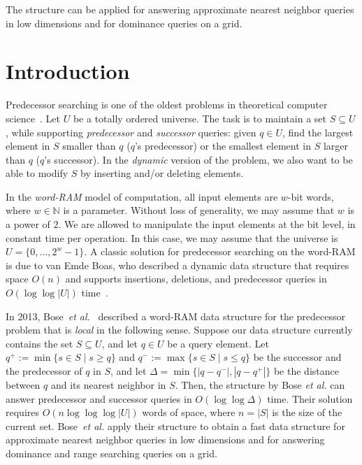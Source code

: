 \documentclass[a4paper,11pt]{article}
\newcommand{\N}{\mathbb{N}}
\newcommand{\etal}{\emph{et al.}\xspace}
\newcommand{\?}{\mskip1.5mu}
\begin{document}
The structure can be applied for answering approximate nearest
neighbor queries in low dimensions and for dominance queries on
a grid.

\section{Introduction}

Predecessor searching is one of the oldest problems in 
theoretical computer science~\cite{CormenLeRiSt09,Knuth98}.
Let $U$ be a totally ordered universe. The task
is to maintain a set $S \subseteq U$,
while supporting
\emph{predecessor} and \emph{successor} queries: 
given $q \in U$, find the largest element in $S$ 
smaller than $q$ ($q$'s predecessor) or the 
smallest element in $S$ larger than $q$
($q$'s successor). In the \emph{dynamic}
version of the problem, we also want to 
be able to modify $S$ by inserting and/or 
deleting elements.

In the \emph{word-RAM } model of computation,
all input elements are $w$-bit words, where
$w \in \N$ is a parameter. Without loss of 
generality, we may assume that $w$ is a power 
of $2$. We are allowed to manipulate the input 
elements at the bit level, in constant time per 
operation. In this case, we may assume that the 
universe is $U = \{0, \dots, 2^{w}-1\}$. 
A classic solution for predecessor searching on the
word-RAM is due to van Emde Boas, who
described a dynamic data structure that
requires space $O(n)$ and supports insertions,
deletions, and predecessor queries in $O(\log\log |U|)$ 
time~\cite{vEmdeBoas77,vEmdeBoasKaZi76}.

In 2013, Bose~\etal~\cite{BoseDoDuHoMo13} described
a word-RAM data structure for the predecessor
problem that is \emph{local} in the following sense.
Suppose our data structure currently contains the
set $S \subseteq U$, and let $q \in U$ be a query
element.  Let $q^+ := \min\{s \in S \mid s \geq q \}$ and
$q^- := \max\{s \in S \mid s \leq q \}$ be the 
successor and the predecessor of $q$ in $S$, and let
$\Delta= \min\{|q- q^-|, |q-q^+|\}$ be the distance
between $q$ and its nearest neighbor in $S$. Then, 
the structure by Bose \etal can answer predecessor 
and successor queries in $O(\log\log \Delta)$ time.
Their solution requires $O(n \log\log\log|U|)$ words 
of space, where $n = |S|$ is the size of the 
current set. Bose~\etal apply their structure 
to obtain a fast data structure for approximate nearest 
neighbor queries in low dimensions and for answering
dominance and range searching queries on a grid.
\end{document}
